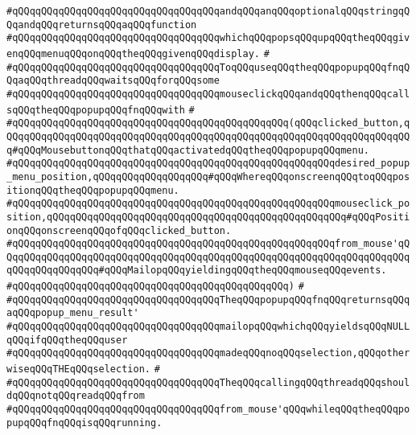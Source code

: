 \verb|#qQQqqQQqqQQqqQQqqQQqqQQqqQQqqQQqqQQqandqQQqanqQQqoptionalqQQqstringqQQqandqQQqreturnsqQQqaqQQqfunction|\newline
\verb|#qQQqqQQqqQQqqQQqqQQqqQQqqQQqqQQqqQQqwhichqQQqpopsqQQqupqQQqtheqQQqgivenqQQqmenuqQQqonqQQqtheqQQqgivenqQQqdisplay.|\newline
\verb|#|\newline
\verb|#qQQqqQQqqQQqqQQqqQQqqQQqqQQqqQQqqQQqToqQQquseqQQqtheqQQqpopupqQQqfnqQQqaqQQqthreadqQQqwaitsqQQqforqQQqsome|\newline
\verb|#qQQqqQQqqQQqqQQqqQQqqQQqqQQqqQQqqQQqmouseclickqQQqandqQQqthenqQQqcallsqQQqtheqQQqpopupqQQqfnqQQqwith|\newline
\verb|#|\newline
\verb|#qQQqqQQqqQQqqQQqqQQqqQQqqQQqqQQqqQQqqQQqqQQqqQQq(qQQqclicked_button,qQQqqQQqqQQqqQQqqQQqqQQqqQQqqQQqqQQqqQQqqQQqqQQqqQQqqQQqqQQqqQQqqQQqqQQq#qQQqMousebuttonqQQqthatqQQqactivatedqQQqtheqQQqpopupqQQqmenu.|\newline
\verb|#qQQqqQQqqQQqqQQqqQQqqQQqqQQqqQQqqQQqqQQqqQQqqQQqqQQqqQQqdesired_popup_menu_position,qQQqqQQqqQQqqQQqqQQq#qQQqWhereqQQqonscreenqQQqtoqQQqpositionqQQqtheqQQqpopupqQQqmenu.|\newline
\verb|#qQQqqQQqqQQqqQQqqQQqqQQqqQQqqQQqqQQqqQQqqQQqqQQqqQQqqQQqmouseclick_position,qQQqqQQqqQQqqQQqqQQqqQQqqQQqqQQqqQQqqQQqqQQqqQQqqQQq#qQQqPositionqQQqonscreenqQQqofqQQqclicked_button.|\newline
\verb|#qQQqqQQqqQQqqQQqqQQqqQQqqQQqqQQqqQQqqQQqqQQqqQQqqQQqqQQqfrom_mouse'qQQqqQQqqQQqqQQqqQQqqQQqqQQqqQQqqQQqqQQqqQQqqQQqqQQqqQQqqQQqqQQqqQQqqQQqqQQqqQQqqQQqqQQq#qQQqMailopqQQqyieldingqQQqtheqQQqmouseqQQqevents.|\newline
\verb|#qQQqqQQqqQQqqQQqqQQqqQQqqQQqqQQqqQQqqQQqqQQqqQQq)|\newline
\verb|#|\newline
\verb|#qQQqqQQqqQQqqQQqqQQqqQQqqQQqqQQqqQQqTheqQQqpopupqQQqfnqQQqreturnsqQQqaqQQqpopup_menu_result'|\newline
\verb|#qQQqqQQqqQQqqQQqqQQqqQQqqQQqqQQqqQQqmailopqQQqwhichqQQqyieldsqQQqNULLqQQqifqQQqtheqQQquser|\newline
\verb|#qQQqqQQqqQQqqQQqqQQqqQQqqQQqqQQqqQQqmadeqQQqnoqQQqselection,qQQqotherwiseqQQqTHEqQQqselection.|\newline
\verb|#|\newline
\verb|#qQQqqQQqqQQqqQQqqQQqqQQqqQQqqQQqqQQqTheqQQqcallingqQQqthreadqQQqshouldqQQqnotqQQqreadqQQqfrom|\newline
\verb|#qQQqqQQqqQQqqQQqqQQqqQQqqQQqqQQqqQQqfrom_mouse'qQQqwhileqQQqtheqQQqpopupqQQqfnqQQqisqQQqrunning.|\newline
